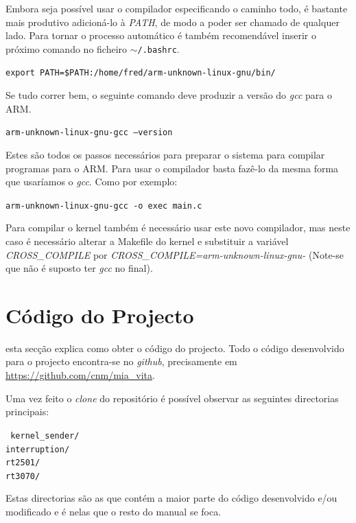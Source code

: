 \documentclass[10pt,a4paper,oneside]{book}
\begin{document}
Embora seja possível usar o compilador especificando o caminho todo, é bastante mais produtivo adicioná-lo à \emph{PATH}, de modo a poder ser chamado de qualquer lado. Para tornar o processo automático é também recomendável inserir o próximo comando no ficheiro {\tt $\sim$/.bashrc}.

\begin{center}
{\tt export PATH=\$PATH:/home/fred/arm-unknown-linux-gnu/bin/}
\end{center}

Se tudo correr bem, o seguinte comando deve produzir a versão do \emph{gcc} para o ARM.

\begin{center}
{\tt arm-unknown-linux-gnu-gcc --version}
\end{center}

Estes são todos os passos necessários para preparar o sistema para compilar programas para o ARM. Para usar o compilador basta fazê-lo da mesma forma que usaríamos o \emph{gcc}. Como por exemplo:

\begin{center}
{\tt arm-unknown-linux-gnu-gcc -o exec main.c}
\end{center}

Para compilar o kernel também é necessário usar este novo compilador, mas neste caso é necessário alterar a Makefile do kernel e substituir a variável \emph{CROSS\_COMPILE} por \emph{CROSS\_COMPILE=arm-unknown-linux-gnu-} (Note-se que não é suposto ter \emph{gcc} no final).

\section{Código do Projecto}

esta secção explica como obter o código do projecto. Todo o código desenvolvido para o projecto encontra-se no \emph{github}, precisamente em \href{https://github.com/cnm/mia\_vita}{https://github.com/cnm/mia\_vita}. 

Uma vez feito o \emph{clone} do repositório é possível observar as seguintes directorias principais:

\begin{flushleft}
  {\tt
    kernel\_sender/\\
    interruption/\\
    rt2501/\\
    rt3070/
  }
\end{flushleft}

Estas directorias são as que contém a maior parte do código desenvolvido e/ou modificado e é nelas que o resto do manual se foca.
\end{document}

